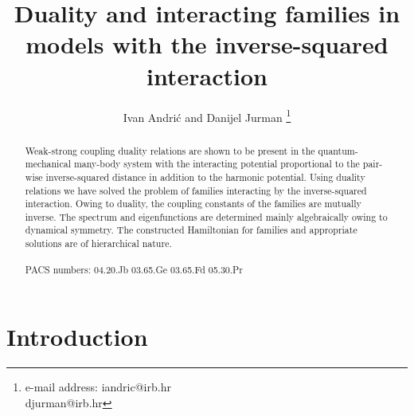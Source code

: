 \documentclass[a4paper,preprint,aps]{revtex4}
\begin{document}
\title{Duality and interacting families in models with the inverse-squared
 interaction}
\author{Ivan Andri\' c and Danijel Jurman
\footnote{e-mail address: 
iandric@irb.hr \\ \hspace*{2.2cm}
djurman@irb.hr }}












\begin{abstract}

 Weak-strong coupling duality relations are shown to be present in the 
quantum-mechanical many-body system with the interacting potential 
proportional to the pair-wise inverse-squared distance in addition to the
 harmonic potential. Using duality relations we have solved the problem of
 families interacting by the inverse-squared interaction. Owing to duality,
  the coupling constants of the families are mutually inverse. The spectrum
 and eigenfunctions are determined mainly algebraically owing to \coordHE{}
 dynamical symmetry. The constructed Hamiltonian for families and appropriate
 solutions are of hierarchical nature.\\
\\ 
PACS numbers: 04.20.Jb  03.65.Ge  03.65.Fd 05.30.Pr 
\end{abstract}



\maketitle

\section{Introduction}
\end{document}
